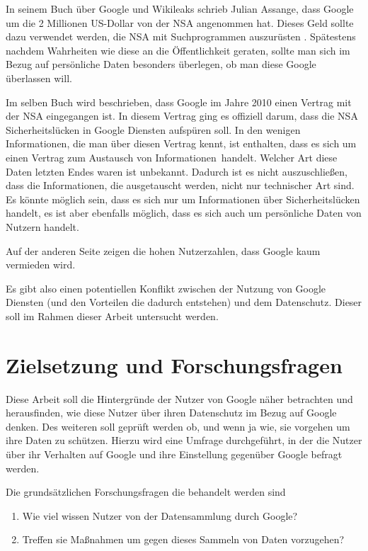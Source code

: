 In seinem Buch über Google und Wikileaks schrieb Julian Assange, dass Google um die 2 Millionen US-Dollar von der NSA angenommen hat. Dieses Geld sollte dazu verwendet werden, die NSA mit Suchprogrammen auszurüsten \cite{assangebook}. Spätestens nachdem Wahrheiten wie diese an die Öffentlichkeit geraten, sollte man sich im Bezug auf persönliche Daten besonders überlegen, ob man diese Google überlassen will.

Im selben Buch wird beschrieben, dass Google im Jahre 2010 einen Vertrag mit der NSA eingegangen ist. In diesem Vertrag ging es offiziell darum, dass die NSA Sicherheitslücken in Google Diensten aufspüren soll. In den wenigen Informationen, die man über diesen Vertrag kennt, ist enthalten, dass es sich um einen Vertrag zum \glqq Austausch von Informationen\grqq\ handelt. Welcher Art diese Daten letzten Endes waren ist unbekannt. Dadurch ist es nicht auszuschließen, dass die Informationen, die ausgetauscht werden, nicht nur technischer Art sind. Es könnte möglich sein, dass es sich nur um Informationen über Sicherheitslücken handelt, es ist aber ebenfalls möglich, dass es sich auch um persönliche Daten von Nutzern handelt.

Auf der anderen Seite zeigen die hohen Nutzerzahlen, dass Google kaum vermieden wird.

Es gibt also einen potentiellen Konflikt zwischen der Nutzung von Google Diensten (und den Vorteilen die dadurch entstehen) und dem Datenschutz. Dieser soll im Rahmen dieser Arbeit untersucht werden.

\section{Zielsetzung und Forschungsfragen}
\label{sec:questions}
Diese Arbeit soll die Hintergründe der Nutzer von Google näher betrachten und herausfinden, wie diese Nutzer über ihren Datenschutz im Bezug auf Google denken. Des weiteren soll geprüft werden ob, und wenn ja wie, sie vorgehen um ihre Daten zu schützen. Hierzu wird eine Umfrage durchgeführt, in der die Nutzer über ihr Verhalten auf Google und ihre Einstellung gegenüber Google befragt werden.

Die grundsätzlichen Forschungsfragen die behandelt werden sind
\begin{enumerate}
\item Wie viel wissen Nutzer von der Datensammlung durch Google?
\item Treffen sie Maßnahmen um gegen dieses Sammeln von Daten vorzugehen?
\end{enumerate}